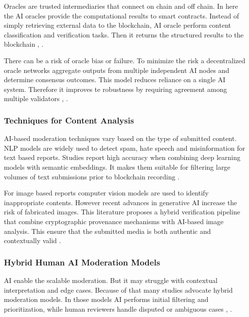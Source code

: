 Oracles are trusted intermediaries that connect on chain and off chain. In here the \ac{AI} oracles provide the computational results to smart contracts. Instead of simply retrieving external data to the blockchain, \ac{AI} oracle perform content classification and verification tasks. Then it returns the structured results to the blockchain \cite{kava2024aipowered}, \cite{zintusart2025empirical}.  

There can be a risk of oracle bias or failure. To minimize the risk a decentralized oracle networks aggregate outputs from multiple independent \ac{AI} nodes and determine consensus outcomes. This model reduces reliance on a single \ac{AI} system. Therefore it improves te robustness by requiring agreement among multiple validators \cite{zintusart2025empirical}, \cite{codezeros2025aipowered}.

\subsubsection*{Techniques for Content Analysis}

\ac{AI}-based moderation techniques vary based on the type of submitted content. \ac{NLP} models are widely used to detect spam, hate speech and misinformation for text based reports. Studies report high accuracy when combining deep learning models with semantic embeddings. It makes them suitable for filtering large volumes of text submissions prior to blockchain recording \cite{wani2024ai}.  

For image based reports computer vision models are used to identify inappropriate contents. However recent advances in generative AI increase the risk of fabricated images. This literature proposes a hybrid verification pipeline that combine cryptographic provenance mechanisms with \ac{AI}-based image analysis. This ensure that the submitted media is both authentic and contextually valid \cite{prasad2024blockchain}.

\subsubsection*{Hybrid Human AI Moderation Models}

AI enable the scalable moderation. But it may struggle with contextual interpretation and edge cases. Because of that many studies advocate hybrid moderation models. In those models AI performs initial filtering and prioritization, while human reviewers handle disputed or ambiguous cases \cite{mohammadi2025ai}, \cite{kumar2025hybrid}. 

